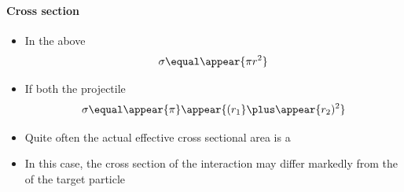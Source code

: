 \begin{frame}
\frametitle{\texorpdfstring{\culine[\sectiontitleulinecolor]{\sectiontitle}}{\sectiontitle} }
\framesubtitle{Cross section}%

\begin{itemize}
	\item In the above
\[
\sigma  \equal \appear{\pi r^{2}}
\]

\item If both the projectile 
\[
\sigma  \equal \appear{\pi} \appear{( r_{1}}  \plus \appear{r_{2} )^{2}}
\]

\item Quite often the actual effective cross sectional area is a 

\item In this case, the cross section of the interaction may differ markedly from the  of the target particle %
\end{itemize}


\endofslide 
\end{frame}

